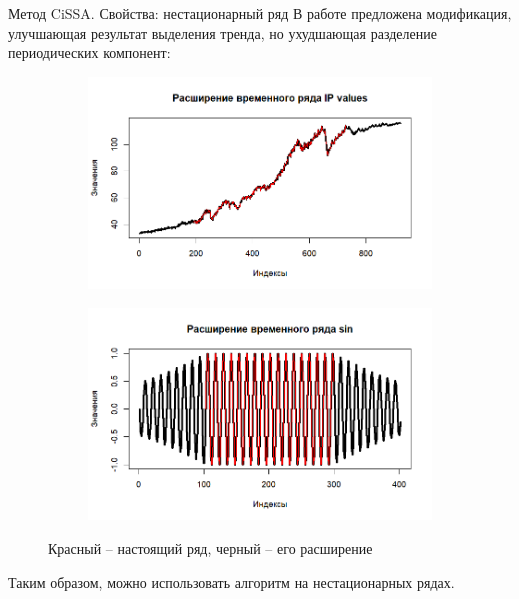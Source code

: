\documentclass[notheorems, handout]{beamer}
\begin{document}
	\begin{frame}{Метод CiSSA. Свойства: нестационарный ряд}
		В работе \parencite{bogalo2020} предложена модификация, улучшающая результат выделения тренда, но ухудшающая разделение периодических компонент:		
		\begin{figure}[htbp]
			\centering
			\begin{subfigure}[b]{0.49\textwidth} %
				\includegraphics[width=\textwidth]{../Text/img/extended_IP_values.png}
			\end{subfigure}
			\hfill %
			\begin{subfigure}[b]{0.49\textwidth} %
				\includegraphics[width=\textwidth]{../Text/img/extended_sin.png}
			\end{subfigure}
			\caption{Красный -- настоящий ряд, черный -- его расширение}
		\end{figure}

		Таким образом, можно использовать алгоритм на нестационарных рядах.
		
		
	\end{frame}
	
\end{document}
